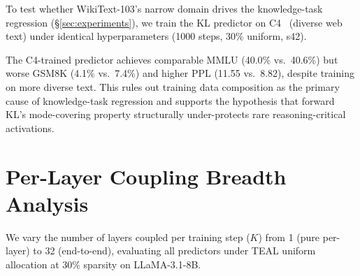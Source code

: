 To test whether WikiText-103's narrow domain drives the knowledge-task regression (\S\ref{sec:experiments}), we train the KL predictor on C4~\cite{raffel2020c4} (diverse web text) under identical hyperparameters (1000 steps, 30\% uniform, s42).

\begin{table}[h]
\centering
\caption{C4-trained vs.\ WikiText-trained KL predictor (LLaMA-3.1-8B, 30\% uniform, s42).}
\label{tab:c4_control}
\end{table}

The C4-trained predictor achieves comparable MMLU (40.0\% vs.\ 40.6\%) but worse GSM8K (4.1\% vs.\ 7.4\%) and higher PPL (11.55 vs.\ 8.82), despite training on more diverse text.
This rules out training data composition as the primary cause of knowledge-task regression and supports the hypothesis that forward KL's mode-covering property structurally under-protects rare reasoning-critical activations.

\section{Per-Layer Coupling Breadth Analysis}
\label{app:k_curve}

We vary the number of layers coupled per training step ($K$) from 1 (pure per-layer) to 32 (end-to-end), evaluating all predictors under TEAL uniform allocation at 30\% sparsity on LLaMA-3.1-8B.

